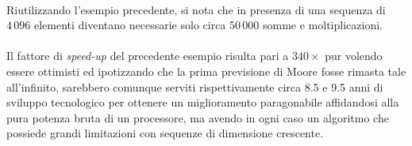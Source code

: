 \\ Riutilizzando l'esempio precedente, si nota che in presenza di una sequenza 
di $4\,096$ elementi diventano necessarie solo circa $50\,000$ somme e 
moltiplicazioni. %
\\ \\
Il fattore di \emph{speed-up} del precedente esempio risulta pari a $340\times$
 pur volendo essere ottimisti ed 
ipotizzando che la prima previsione di Moore fosse rimasta tale all'infinito, 
sarebbero comunque serviti rispettivamente circa 8.5 e 9.5 anni di sviluppo 
tecnologico per ottenere un miglioramento paragonabile affidandosi alla pura 
potenza bruta di un processore, ma avendo in ogni caso un algoritmo che possiede
grandi limitazioni con sequenze di dimensione crescente. %
